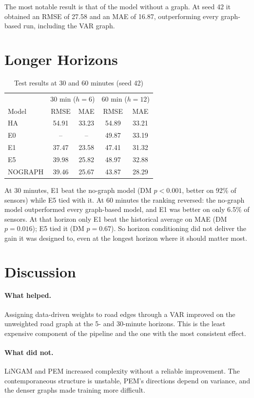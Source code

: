 \documentclass[MTech]{ugthesis}
\begin{document}
The most notable result is that of the model without a graph. At seed 42 it obtained an RMSE of 27.58 and an MAE of 16.87, outperforming every graph-based run, including the VAR graph.

\section{Longer Horizons}
\begin{table}[h]
\centering
\caption{Test results at 30 and 60 minutes (seed 42)}
\begin{tabular}{lcccc}
\hline
 & \multicolumn{2}{c}{30 min ($h=6$)} & \multicolumn{2}{c}{60 min ($h=12$)} \\
Model & RMSE & MAE & RMSE & MAE \\
\hline
HA & 54.91 & 33.23 & 54.89 & 33.21 \\
E0 & -- & -- & 49.87 & 33.19 \\
E1 & 37.47 & 23.58 & 47.41 & 31.32 \\
E5 & 39.98 & 25.82 & 48.97 & 32.88 \\
NOGRAPH & 39.46 & 25.67 & 43.87 & 28.29 \\
\hline
\end{tabular}
\label{tab:resh}
\end{table}

At 30 minutes, E1 beat the no-graph model (DM $p<0.001$, better on 92\% of sensors) while E5 tied with it. At 60 minutes the ranking reversed: the no-graph model outperformed every graph-based model, and E1 was better on only 6.5\% of sensors. At that horizon only E1 beat the historical average on MAE (DM $p=0.016$); E5 tied it (DM $p=0.67$). So horizon conditioning did not deliver the gain it was designed to, even at the longest horizon where it should matter most.

\section{Discussion}
\paragraph{What helped.} Assigning data-driven weights to road edges through a VAR improved on the unweighted road graph at the 5- and 30-minute horizons. This is the least expensive component of the pipeline and the one with the most consistent effect.

\paragraph{What did not.} LiNGAM and PEM increased complexity without a reliable improvement. The contemporaneous structure is unstable, PEM's directions depend on variance, and the denser graphs made training more difficult.
\end{document}
